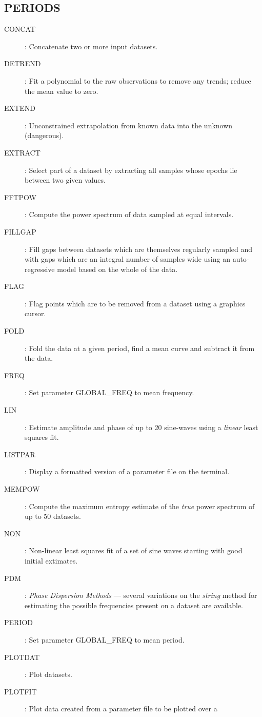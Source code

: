 \subsection {PERIODS}
\begin{description}
\begin{description}
\item [CONCAT]: Concatenate two or more input datasets.
\item [DETREND]: Fit a polynomial to the raw observations to remove any trends;
reduce the mean value to zero.
\item [EXTEND]: Unconstrained extrapolation from known data into the unknown
(dangerous).
\item [EXTRACT]: Select part of a dataset by extracting all samples whose epochs
lie between two given values.
\item [FFTPOW]: Compute the power spectrum of data sampled at equal intervals.
\item [FILLGAP]: Fill gaps between datasets which are themselves regularly
sampled and with gaps which are an integral number of samples wide using an
auto-regressive model based on the whole of the data.
\item [FLAG]: Flag points which are to be removed from a dataset using a graphics
cursor.
\item [FOLD]: Fold the data at a given period, find a mean curve and subtract
it from the data.
\item [FREQ]: Set parameter GLOBAL\_FREQ to mean frequency.
\item [LIN]: Estimate amplitude and phase of up to 20 sine-waves using a
{\em linear} least squares fit.
\item [LISTPAR]: Display a formatted version of a parameter file on the
terminal.
\item [MEMPOW]: Compute the maximum entropy estimate of the {\em true} power
spectrum of up to 50 datasets.
\item [NON]: Non-linear least squares fit of a set of sine waves starting with
good initial extimates.
\item [PDM]: {\em Phase Dispersion Methods} --- several variations on the
{\em string} method for estimating the possible frequencies present on a
dataset are available.
\item [PERIOD]: Set parameter GLOBAL\_FREQ to mean period.
\item [PLOTDAT]: Plot datasets.
\item [PLOTFIT]: Plot data created from a parameter file to be plotted over a

\end{description}
\end{description}
